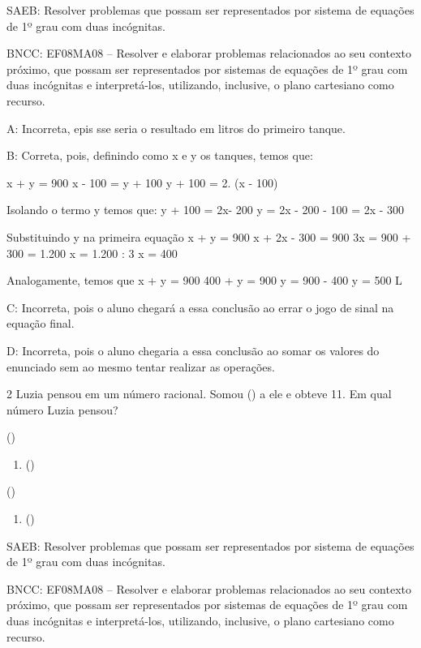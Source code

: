 {SAEB: Resolver problemas que possam ser representados por sistema de
equações de 1º grau com duas incógnitas.

BNCC: EF08MA08 -- Resolver e elaborar problemas relacionados ao seu
contexto próximo, que possam ser representados por sistemas de equações
de 1º grau com duas incógnitas e interpretá-los, utilizando, inclusive,
o plano cartesiano como recurso.

A: Incorreta, epis sse seria o resultado em litros do primeiro tanque.

B: Correta, pois, definindo como x e y os tanques, temos que:

x + y = 900 x - 100 = y + 100 y + 100 = 2. (x - 100)

Isolando o termo y temos que: y + 100 = 2x- 200 y = 2x - 200 - 100 = 2x
- 300

Substituindo y na primeira equação x + y = 900 x + 2x - 300 = 900 3x =
900 + 300 = 1.200 x = 1.200 : 3 x = 400

Analogamente, temos que x + y = 900 400 + y = 900 y = 900 - 400 y = 500
L

C: Incorreta, pois o aluno chegará a essa conclusão ao errar o jogo de
sinal na equação final.

D: Incorreta, pois o aluno chegaria a essa conclusão ao somar os valores
do enunciado sem ao mesmo tentar realizar as operações.

\num{2} Luzia pensou em um número racional. Somou () a ele e
obteve 11. Em qual número Luzia pensou?
\item ()

\begin{enumerate}
\def\labelenumi{\alph{enumi})}
\setcounter{enumi}{1}
\tightlist
\item
  ()
\end{enumerate}
\item ()

\begin{enumerate}
\def\labelenumi{\alph{enumi})}
\setcounter{enumi}{3}
\tightlist
\item
  ()
\end{enumerate}

SAEB: Resolver problemas que possam ser representados por sistema de
equações de 1º grau com duas incógnitas.

BNCC: EF08MA08 -- Resolver e elaborar problemas relacionados ao seu
contexto próximo, que possam ser representados por sistemas de equações
de 1º grau com duas incógnitas e interpretá-los, utilizando, inclusive,
o plano cartesiano como recurso.

}
